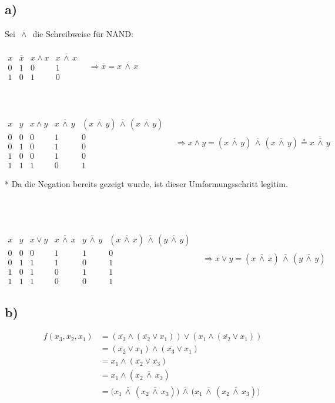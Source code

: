 \documentclass[a4paper]{scrartcl}
\newcommand{\nand}{\,\overline{\land}\,}
\begin{document}
	\subsection{a)}
		Sei \(\nand\) die Schreibweise für NAND: \\ \\
		\(\begin{array}{c|c|c|c}
			x&\overline{x}&x\land x& x\nand x\\ \hline
			0&1&0&1 \\
			1&0&1&0
		\end{array}\quad\Rightarrow \overline{x}=x\nand x \) \\ \\ \\ \\
		\(\begin{array}{c|c|c|c|c}
			x&y&x\land y & x\nand y &(x\nand y)\nand 
			(x\nand y)\\ \hline
			0&0&0&1&0 \\
			0&1&0&1&0 \\
			1&0&0&1&0 \\
			1&1&1&0&1
		\end{array}\quad\Rightarrow x\land y = (x\nand y)\nand(x\nand y)\overset{*}
		{=}\overline{x\nand y}\) \\ 
		\begin{small}
			* Da die Negation bereits gezeigt wurde, ist dieser Umformungsschritt legitim.
		\end{small} \\ \\ \\
		\(\begin{array}{c|c|c|c|c|c}
			x&y&x\vee y& x\nand x& y\nand y&(x\nand x)\nand(y\nand y)\\ \hline
			0&0&0&1&1&0 \\
			0&1&1&1&0&1 \\
			1&0&1&0&1&1 \\
			1&1&1&0&0&1
		\end{array}\quad\Rightarrow x\vee y = (x\nand x)\nand(y\nand y)\)

	\subsection{b)}
		\begin{align}
			f(x_3,x_2,x_1)&=(\overline{x_3}\land(\overline{x_2}\vee x_1)) \vee 
			(x_1\land(\overline{x_2} \vee x_1)) \\
			&= (\overline{x_2}\vee x_1)\land(\overline{x_3}\vee x_1) \\
			&=x_1\land (\overline{x_2}\vee \overline{x_3}) \\
			&=x_1\land (x_2\nand x_3) \\
			&=\big(x_1\nand(x_2\nand x_3)\big)\nand\big(x_1\nand(x_2\nand x_3)\big)
		\end{align}
		
\end{document}
